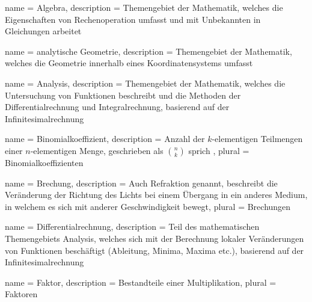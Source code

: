 
    \usepackage[toc]{glossaries}
    \makeglossaries




    
    {
        name = Algebra,
        description = {Themengebiet der Mathematik, welches die Eigenschaften von Rechenoperation umfasst und mit Unbekannten in Gleichungen arbeitet}
    }
    
    {
        name = analytische Geometrie,
        description = {Themengebiet der Mathematik, welches die Geometrie innerhalb eines Koordinatensystems umfasst}
    }
    
    {
        name = Analysis,
        description = {Themengebiet der Mathematik, welches die Untersuchung von Funktionen beschreibt und die Methoden der \Gls{Differentialrechnung} und \Gls{Integralrechnung}, basierend auf der \Gls{Infinitesimalrechnung}}
    }
    
    {
        name = Binomialkoeffizient,
        description = {Anzahl der $k$-elementigen Teilmengen einer $n$-elementigen Menge, geschrieben als $\binom{n}{k}$ sprich },
        plural = {Binomialkoeffizienten}
    }  
    
    {
        name = Brechung,
        description = {Auch Refraktion genannt, beschreibt die Veränderung der Richtung des Lichts bei einem Übergang in ein anderes Medium, in welchem es sich mit anderer Geschwindigkeit bewegt},
        plural = {Brechungen}
    }
    
    {
        name = Differentialrechnung,
        description = {Teil des mathematischen Themengebiets Analysis, welches sich mit der Berechnung lokaler Veränderungen von Funktionen beschäftigt (Ableitung, Minima, Maxima etc.), basierend auf der \Gls{Infinitesimalrechnung}}
    }
    
    {
        name = Faktor,
        description = {Bestandteile einer Multiplikation},
        plural = Faktoren
    }
    
